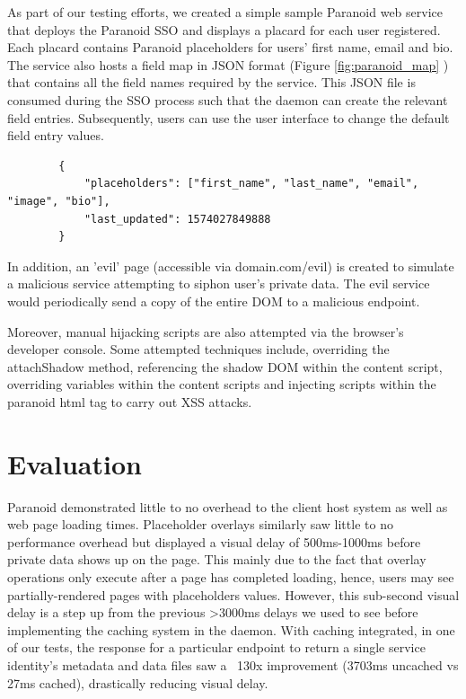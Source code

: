 \documentclass[letterpaper,twocolumn,10pt]{article}
\begin{document}
As part of our testing efforts, we created a simple sample Paranoid web service that deploys the Paranoid SSO and displays a placard for each user registered. Each placard contains Paranoid placeholders for users' first name, email and bio. The service also hosts a field map in JSON format (Figure \ref{fig:paranoid_map} ) that contains all the field names required by the service. This JSON file is consumed during the SSO process such that the daemon can create the relevant field entries. Subsequently, users can use the user interface to change the default field entry values.

\begin{center}
    \begin{lstlisting}
        {
            "placeholders": ["first_name", "last_name", "email", "image", "bio"],
            "last_updated": 1574027849888
        }
    \end{lstlisting}
    \label{fig:paranoid_map}
\end{center}

In addition, an 'evil' page (accessible via domain.com/evil) is created to simulate a  malicious service attempting to siphon user's private data. The evil service would periodically send a copy of the entire DOM to a malicious endpoint.

Moreover, manual hijacking scripts are also attempted via the browser's developer console. Some attempted techniques include, overriding the attachShadow method, referencing the shadow DOM within the content script, overriding variables within the content scripts and injecting scripts within the paranoid html tag to carry out XSS attacks.

\section{Evaluation}

Paranoid demonstrated little to no overhead to the client host system as well as web page loading times. Placeholder overlays similarly saw little to no performance overhead but displayed a visual delay of 500ms-1000ms before private data shows up on the page. This mainly due to the fact that overlay operations only execute after a page has completed loading, hence, users may see partially-rendered pages with placeholders values. However, this sub-second visual delay is a step up from the previous >3000ms delays we used to see before implementing the caching system in the daemon. With caching integrated, in one of our tests, the response for a particular endpoint to return a single service identity's metadata and data files saw a ~130x improvement (3703ms uncached vs 27ms cached), drastically reducing visual delay.
\end{document}

